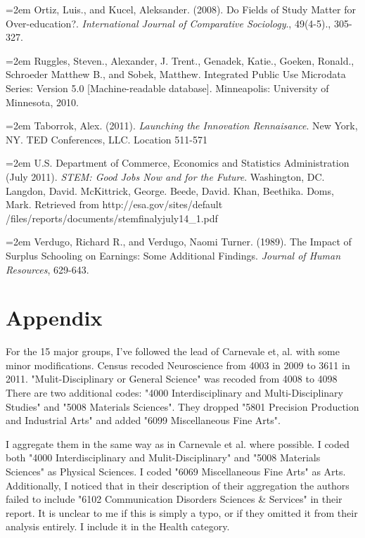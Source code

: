 \documentclass[11pt]{article}
\theoremstyle{definition}
\begin{document}
\vspace{2mm}
\noindent
\hangindent=2em
Ortiz, Luis., and Kucel, Aleksander. (2008). Do Fields of Study Matter for Over-education?. \textit{International Journal of Comparative Sociology}., 49(4-5)., 305-327.

\vspace{2mm}
\noindent
\hangindent=2em
Ruggles, Steven., Alexander, J. Trent., Genadek, Katie., Goeken, Ronald., Schroeder Matthew B., and Sobek, Matthew. Integrated Public Use Microdata Series: Version 5.0 [Machine-readable database]. Minneapolis: University of Minnesota, 2010.

\vspace{2mm}
\noindent
\hangindent=2em
Taborrok, Alex. (2011). \textit{Launching the Innovation Rennaisance}. New York, NY. TED Conferences, LLC. Location 511-571

\vspace{2mm}
\noindent
\hangindent=2em
U.S. Department of Commerce, Economics and Statistics Administration (July 2011). \textit{STEM: Good Jobs Now and for the Future}. Washington, DC. Langdon, David. McKittrick, George. Beede, David. Khan, Beethika. Doms, Mark.  Retrieved from http://esa.gov/sites/default\\/files/reports/documents/stemfinalyjuly14\_1.pdf

\vspace{2mm}
\noindent
\hangindent=2em
Verdugo, Richard R., and Verdugo, Naomi Turner. (1989). The Impact of Surplus Schooling on Earnings: Some Additional Findings. \textit{Journal of Human Resources}, 629-643.

\section*{Appendix}
\indent
\par


For the 15 major groups, I've followed the lead of Carnevale et, al. with some minor modifications.
Census recoded Neuroscience from 4003 in 2009 to 3611 in 2011.  "Mulit-Disciplinary or General Science" was recoded from 4008 to 4098 There are two additional codes: "4000 Interdisciplinary and Multi-Disciplinary Studies" and "5008 Materials Sciences".  They dropped "5801 Precision Production and Industrial Arts" and added "6099 Miscellaneous Fine Arts". 

\vspace{2mm}
I aggregate them in the same way as in Carnevale et al. where possible.  I coded both "4000 Interdisciplinary and Mulit-Disciplinary" and "5008 Materials Sciences" as Physical Sciences.  I coded "6069 Miscellaneous Fine Arts" as Arts.  Additionally, I noticed that in their description of their aggregation the authors failed to include "6102 Communication Disorders Sciences \& Services" in their report.  It is unclear to me if this is simply a typo, or if they omitted it from their analysis entirely.  I include it in the Health category.  
\end{document}
